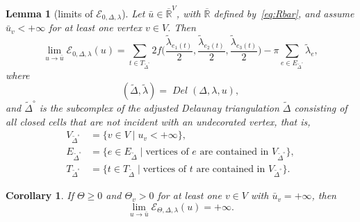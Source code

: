 \documentclass[a4paper, 11pt]{article}
\newcommand{\R}{\mathbb{R}}
\newcommand{\Rbar}{\overline{\R}}
\newcommand{\Deltil}{\widetilde{\Delta}}
\newcommand{\Deltilo}{\Deltil^{\circ}}
\newcommand{\lamtil}{\tilde{\lambda}}
\newcommand{\Del}{\operatorname{\textit{Del}}}
\newcommand{\Ecal}{\mathcal{E}}
\newcommand{\ubar}{\bar{u}}
\theoremstyle{plain}
\newtheorem{lemma}[theorem]{Lemma}
\newtheorem{corollary}[theorem]{Corollary}
\theoremstyle{definition}
\begin{document}
\begin{lemma}[limits of $\Ecal_{0,\Delta,\lambda}$]
  \label{lem:limEcal0}
  Let $\ubar\in\Rbar^{V}$, with $\Rbar$ defined by~\eqref{eq:Rbar},
  and assume $\ubar_{v}<+\infty$ for at least one vertex $v\in V$. Then
  \begin{equation}
    \label{eq:limEcal0}
    \lim_{u\rightarrow\ubar}\Ecal_{0,\Delta,\lambda}(u)=
    \sum_{t\in T_{\Deltilo}}
    2f \Big( \frac{\lamtil_{e_{1}(t)}}{2},
    \frac{\lamtil_{e_{2}(t)}}{2}, \frac{\lamtil_{e_{3}(t)}}{2} \Big)
    -
    \pi\sum_{e\in E_{\Deltilo}}\lamtil_{e},
  \end{equation}
  where 
  \begin{equation*}
    (\Deltil,\lamtil)=\Del(\Delta,\lambda,u), 
  \end{equation*}
  and $\Deltilo$ is the subcomplex of the adjusted Delaunay
  triangulation $\Deltil$ consisting of all closed cells that are not
  incident with an undecorated vertex, that is,
  \begin{align*}
    V_{\Deltilo}&=\{v\in V\;|\;u_{v}<+\infty\},\\
    E_{\Deltilo}&=\{e\in E_{\Deltil}\;|\;
                  \text{vertices of $e$ are contained in }V_{\Deltilo} 
                  \},\\
    T_{\Deltilo}&=\{t\in T_{\Deltil}\;|\;
                  \text{vertices of $t$ are contained in }V_{\Deltilo} 
                  \}.
  \end{align*}
\end{lemma}

\begin{corollary}
  \label{cor:limEcal}
  If $\Theta\geq 0$ and $\Theta_{v}>0$ for at least one $v\in V$
  with $\ubar_{v}=+\infty$, then 
  \begin{equation*}
    \lim_{u\rightarrow\ubar}\Ecal_{\Theta,\Delta,\lambda}(u)=+\infty.
  \end{equation*}
\end{corollary}
\end{document}
